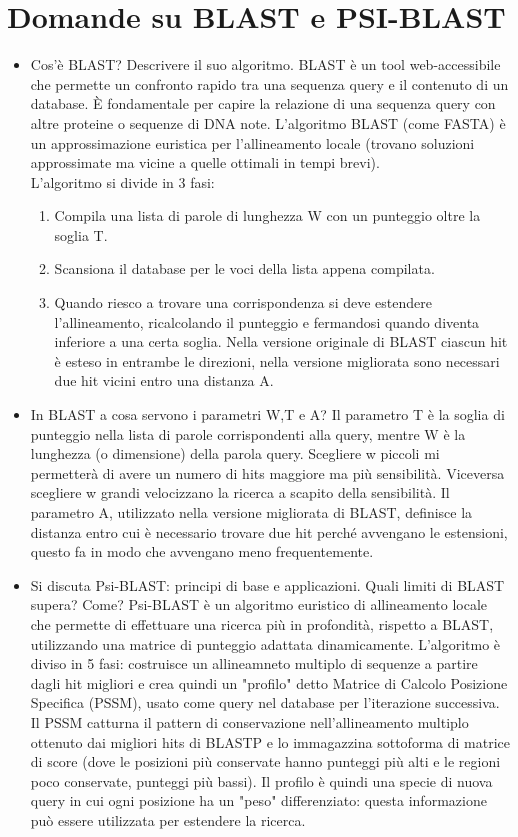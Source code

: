 \documentclass{article}
\begin{document}
\section{Domande su BLAST e PSI-BLAST}
\begin{itemize}
   \item Cos'è BLAST? Descrivere il suo algoritmo.
      \subitem{-} BLAST è un tool web-accessibile che permette un confronto rapido tra una sequenza query e il contenuto di un database. È fondamentale per capire la relazione di una sequenza query con altre proteine o sequenze di DNA note. L'algoritmo BLAST (come FASTA) è un approssimazione euristica per l'allineamento locale (trovano soluzioni approssimate ma vicine a quelle ottimali in tempi brevi).\\
      L'algoritmo si divide in 3 fasi:
      \begin{enumerate}
         \item Compila una lista di parole di lunghezza W con un punteggio oltre la soglia T.
         \item Scansiona il database per le voci della lista appena compilata.
         \item Quando riesco a trovare una corrispondenza si deve estendere l'allineamento, ricalcolando il punteggio e fermandosi quando diventa inferiore a una certa soglia. Nella versione originale di BLAST ciascun hit è esteso in entrambe le direzioni, nella versione migliorata sono necessari due hit vicini entro una distanza A.
      \end{enumerate}
   \item In BLAST a cosa servono i parametri W,T e A?
      \subitem{-} Il parametro T è la soglia di punteggio nella lista di parole corrispondenti alla query, mentre W  è la lunghezza (o dimensione) della parola query. Scegliere w piccoli mi permetterà di avere un numero di hits maggiore ma più sensibilità. Viceversa scegliere w grandi velocizzano la ricerca a scapito della sensibilità. Il parametro A, utilizzato nella versione migliorata di BLAST, definisce la distanza entro cui è necessario trovare due hit perché avvengano le estensioni, questo fa in modo che avvengano meno frequentemente.
   \item Si discuta Psi-BLAST: principi di base e applicazioni. Quali limiti di BLAST supera? Come?
      \subitem{-} Psi-BLAST è un algoritmo euristico di allineamento locale che permette di effettuare una ricerca più in profondità, rispetto a BLAST, utilizzando una matrice di punteggio adattata dinamicamente. L'algoritmo è diviso in 5 fasi: costruisce un allineamneto multiplo di sequenze a partire dagli hit migliori e crea quindi un "profilo" detto Matrice di Calcolo Posizione Specifica (PSSM), usato come query nel database per l'iterazione successiva. Il PSSM catturna il pattern di conservazione nell'allineamento multiplo ottenuto dai migliori hits di BLASTP e lo immagazzina sottoforma di matrice di score (dove le posizioni più conservate hanno punteggi più alti e le regioni poco conservate, punteggi più bassi). Il profilo è quindi una specie di nuova query in cui ogni posizione ha un "peso" differenziato: questa informazione può essere utilizzata per estendere la ricerca.\\

\end{itemize}
\end{document}
